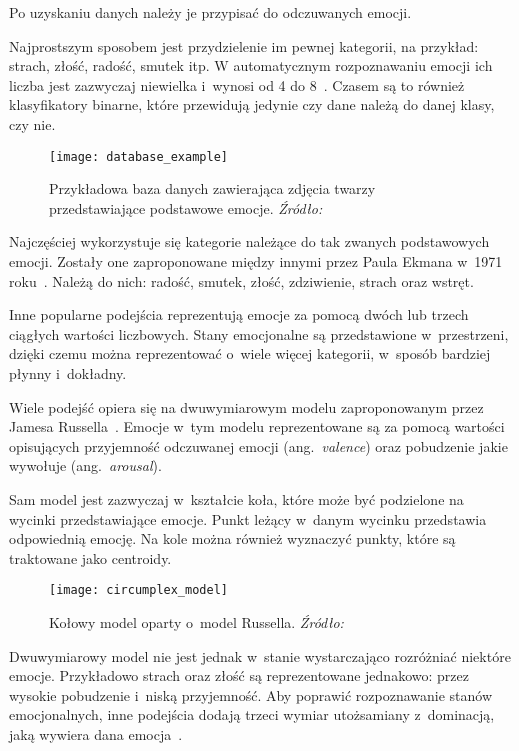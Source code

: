 Po uzyskaniu danych należy je przypisać do odczuwanych emocji.

Najprostszym sposobem jest przydzielenie im pewnej kategorii, na przykład: strach, złość, radość, smutek itp.
W automatycznym rozpoznawaniu emocji ich liczba jest zazwyczaj niewielka i~wynosi od 4 do 8~\cite{Dzedzickis2020}.
Czasem są to również klasyfikatory binarne, które przewidują jedynie czy dane należą do danej klasy, czy nie.

\begin{figure}[h]
    \centering
    \texttt{[image: database\_example]}
    \caption{Przykładowa baza danych zawierająca zdjęcia twarzy przedstawiające podstawowe emocje. \textit{Źródło:~\cite{Li2017}}}
    \label{fig:database-example}
\end{figure}

Najczęściej wykorzystuje się kategorie należące do tak zwanych podstawowych emocji.
Zostały one zaproponowane między innymi przez Paula Ekmana w~1971 roku~\cite{Ekman1971}.
Należą do nich: radość, smutek, złość, zdziwienie, strach oraz wstręt.

Inne popularne podejścia reprezentują emocje za pomocą dwóch lub trzech ciągłych wartości liczbowych.
Stany emocjonalne są przedstawione w~przestrzeni, dzięki czemu można reprezentować o~wiele więcej kategorii, w~sposób bardziej płynny i~dokładny.

Wiele podejść opiera się na dwuwymiarowym modelu zaproponowanym przez Jamesa Russella~\cite{Russell1980}.
Emocje w~tym modelu reprezentowane są za pomocą wartości opisujących przyjemność odczuwanej emocji (ang.~\textit{valence}) oraz pobudzenie jakie wywołuje (ang.~\textit{arousal}).

Sam model jest zazwyczaj w~kształcie koła, które może być podzielone na wycinki przedstawiające emocje.
Punkt leżący w~danym wycinku przedstawia odpowiednią emocję.
Na kole można również wyznaczyć punkty, które są traktowane jako centroidy.

\begin{figure}[h]
    \centering
    \texttt{[image: circumplex\_model]}
    \caption{Kołowy model oparty o~model Russella. \textit{Źródło:~\cite{Dzedzickis2020}}}
    \label{fig:circumplex-model}
\end{figure}

Dwuwymiarowy model nie jest jednak w~stanie wystarczająco rozróżniać niektóre emocje.
Przykładowo strach oraz złość są reprezentowane jednakowo: przez wysokie pobudzenie i~niską przyjemność.
Aby poprawić rozpoznawanie stanów emocjonalnych, inne podejścia dodają trzeci wymiar utożsamiany z~dominacją, jaką wywiera dana emocja~\cite{Calvo2015}.


